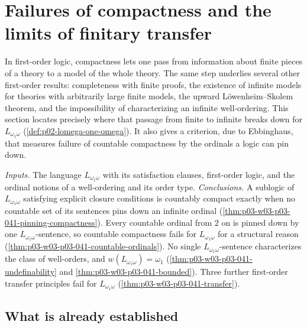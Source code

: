 \section{Failures of compactness and the limits of finitary transfer}
\label{sec:p03-w03-p03-041-compactness-failures}

In first-order logic, compactness lets one pass from information about
finite pieces of a theory to a model of the whole theory. The same step
underlies several other first-order results: completeness with finite
proofs, the existence of infinite models for theories with arbitrarily
large finite models, the upward L\"owenheim--Skolem theorem, and the
impossibility of characterizing an infinite well-ordering. This section
locates precisely where that passage from finite to infinite breaks down
for \(L_{\omega_1\omega}\) (\cref{def:p02-lomega-one-omega}). It also
gives a criterion, due to Ebbinghaus, that measures failure of countable
compactness by the ordinals a logic can pin down.

\emph{Inputs.} The language \(L_{\omega_1\omega}\) with its satisfaction
clauses, first-order logic, and the ordinal notions of a well-ordering and
its order type. \emph{Conclusions.} A sublogic of \(L_{\omega_1\omega}\)
satisfying explicit closure conditions is countably compact exactly when no
countable set of its sentences pins down an infinite ordinal
(\cref{thm:p03-w03-p03-041-pinning-compactness}). Every countable ordinal
from \(2\) on is pinned down by one \(L_{\omega_1\omega}\)-sentence, so
countable compactness fails for \(L_{\omega_1\omega}\) for a structural
reason (\cref{thm:p03-w03-p03-041-countable-ordinals}). No single
\(L_{\omega_1\omega}\)-sentence characterizes the class of well-orders,
and \(w(L_{\omega_1\omega})=\omega_1\)
(\cref{thm:p03-w03-p03-041-undefinability} and
\cref{thm:p03-w03-p03-041-bounded}). Three further
first-order transfer principles fail for \(L_{\omega_1\omega}\)
(\cref{thm:p03-w03-p03-041-transfer}).

\subsection{What is already established}
\label{sec:p03-w03-p03-041-established}


